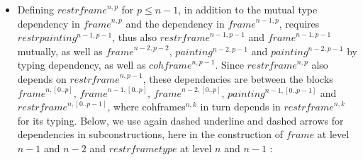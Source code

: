 \documentclass{article}
\newcommand{\myframe}{\mathit{frame}}
\newcommand{\painting}{\mathit{painting}}
\newcommand{\restrframe}{\mathit{restrframe}}
\newcommand{\restrframetype}{\mathit{restrframetype}}
\newcommand{\restrpainting}{\mathit{restrpainting}}
\newcommand{\cohframe}{\mathit{cohframe}}
\newcommand{\udensdash}[1]{%
    \tikz[baseline=(todotted.base)]{
        \node[inner sep=1pt,outer sep=0pt] (todotted) {$#1$};
        \draw[densely dashed] (todotted.south west) -- (todotted.south east);
    }%
}%
\begin{document}
\begin{itemize}
$$\begin{array}{llcl}
\begin{array}{l}
\begin{array}{l}
                                    \restrframe^{n,[0,...,p]} \\
                                    \restrframe^{n,[p+1,...,n-1]} \\
                                    E \\
                        \end{array}\right)(d,l) \\
                    \end{array}\right)                    \\
          \end{array}
          $$

          From which we can deduce $\painting^{n,[0,...,p]}$ by recursion on $p$.

  \item Defining $\restrframe^{n,p}$ for $p\leq n-1$, in addition to the
        mutual type dependency in $\myframe^{n,p}$ and the dependency in
        $\myframe^{n-1,p}$, requires $\restrpainting^{n-1,p-1}$, thus also
        $\restrframe^{n-1,p-1}$ and $\myframe^{n-1,p-1}$ mutually, as well
        as $\myframe^{n-2,p-2}$, $painting^{n-2,p-1}$ and
        $\painting^{n-2,p-1}$ by typing dependency, as well as
        $\cohframe^{n,p-1}$. Since $\restrframe^{n,p}$ also depends on
        $\restrframe^{n,p-1}$, these dependencies are between the blocks
        $\myframe^{n,[0..p]}$, $\myframe^{n-1,[0..p]}$,
        $\myframe^{n-2,[0..p]}$, $\painting^{n-1,[0..p-1]}$ and
        $\restrframe^{n,[0..p-1]}$, where cohframes$^{n,k}$ in turn depends
        in $\restrframe^{n,k}$ for its typing. Below, we use again dashed
        underline and dashed arrows for dependencies in subconstructions,
        here in the construction of $\myframe$ at level $n-1$ and $n-2$ and $\restrframetype$ at level $n$ and $n-1$ :

        \begin{center}
        \end{center}


\end{itemize}
\end{document}
